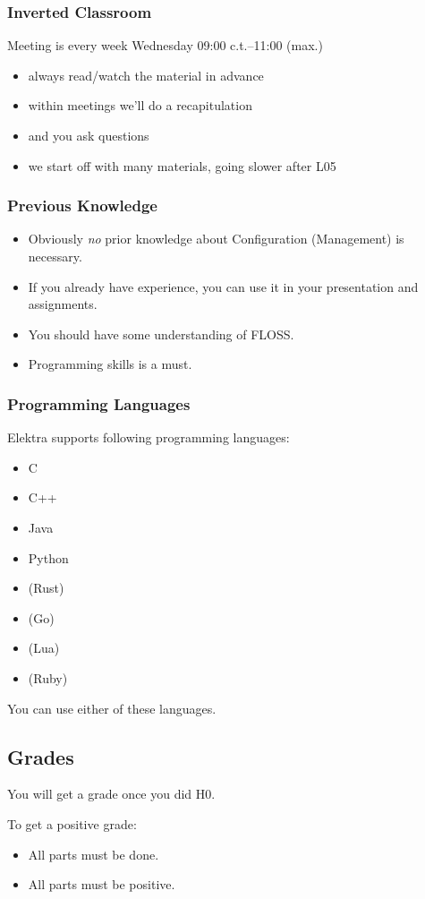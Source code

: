 \begin{frame}
	\frametitle{Inverted Classroom}
	Meeting is every week Wednesday 09:00 c.t.--11:00 (max.)

	\begin{itemize}[<+->]
		\item always read/watch the material in advance
		\item within meetings we'll do a recapitulation
		\item and you ask questions
		\item we start off with many materials, going slower after L05
	\end{itemize}
\end{frame}

\begin{frame}
	\frametitle{Previous Knowledge}
	\begin{itemize}[<+->]
		\item Obviously \textit{no} prior knowledge about Configuration (Management) is necessary.
		\item If you already have experience, you can use it in your presentation and assignments.
		\item You should have some understanding of FLOSS.
		\item Programming skills is a must.
	\end{itemize}
\end{frame}

\begin{frame}
	\frametitle{Programming Languages}
	Elektra supports following programming languages:
	\begin{itemize}
		\item C
		\item C++
		\item Java
		\item Python
		\item (Rust)
		\item (Go)
		\item (Lua)
		\item (Ruby)
	\end{itemize}
	You can use either of these languages.
\end{frame}

\subsection{Grades}

\begin{frame}
	You will get a grade once you did H0.
	\vspace{1cm}

	To get a positive grade:
	\begin{itemize}
		\item All parts must be done.
		\item All parts must be positive.
	\end{itemize}
\end{frame}

